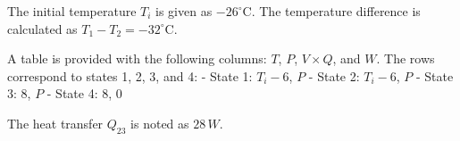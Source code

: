 The initial temperature \( T_i \) is given as \( -26^\circ\text{C} \). The temperature difference is calculated as \( T_1 - T_2 = -32^\circ\text{C} \).  

A table is provided with the following columns: \( T \), \( P \), \( V \times Q \), and \( W \). The rows correspond to states 1, 2, 3, and 4:  
- State 1: \( T_i - 6 \), \( P \)  
- State 2: \( T_i - 6 \), \( P \)  
- State 3: \( 8 \), \( P \)  
- State 4: \( 8 \), \( 0 \)  

The heat transfer \( Q_{\text{23}} \) is noted as \( 28 \, W \).
